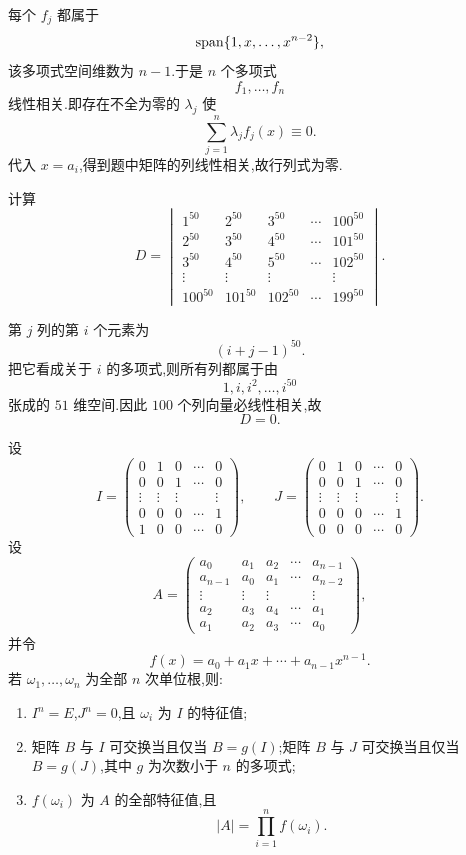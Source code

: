 \begin{solution}
每个 $f_j$ 都属于
\[
\operatorname{span}\{1,x,\ldots,x^{n-2}\},
\]
该多项式空间维数为 $n-1$.于是 $n$ 个多项式
\[
f_1,\ldots,f_n
\]
线性相关.即存在不全为零的 $\lambda_j$ 使
\[
\displaystyle\sum\limits_{j=1}^{n}\lambda_jf_j(x)\equiv0.
\]
代入 $x=a_i$,得到题中矩阵的列线性相关,故行列式为零.
\end{solution}


\begin{example}
计算
\[
D=
\begin{vmatrix}
1^{50}&2^{50}&3^{50}&\cdots&100^{50}\\
2^{50}&3^{50}&4^{50}&\cdots&101^{50}\\
3^{50}&4^{50}&5^{50}&\cdots&102^{50}\\
\vdots&\vdots&\vdots&&\vdots\\
100^{50}&101^{50}&102^{50}&\cdots&199^{50}
\end{vmatrix}.
\]
\end{example}
\exampleblank

\begin{solution}
第 $j$ 列的第 $i$ 个元素为
\[
(i+j-1)^{50}.
\]
把它看成关于 $i$ 的多项式,则所有列都属于由
\[
1,i,i^2,\ldots,i^{50}
\]
张成的 $51$ 维空间.因此 $100$ 个列向量必线性相关,故
\[
\boxed{D=0}.
\]
\end{solution}


\begin{proposition}
设
\[
I=
\begin{pmatrix}
0&1&0&\cdots&0\\
0&0&1&\cdots&0\\
\vdots&\vdots&\vdots&&\vdots\\
0&0&0&\cdots&1\\
1&0&0&\cdots&0
\end{pmatrix},
\qquad
J=
\begin{pmatrix}
0&1&0&\cdots&0\\
0&0&1&\cdots&0\\
\vdots&\vdots&\vdots&&\vdots\\
0&0&0&\cdots&1\\
0&0&0&\cdots&0
\end{pmatrix}.
\]
设
\[
A=
\begin{pmatrix}
a_0&a_1&a_2&\cdots&a_{n-1}\\
a_{n-1}&a_0&a_1&\cdots&a_{n-2}\\
\vdots&\vdots&\vdots&&\vdots\\
a_2&a_3&a_4&\cdots&a_1\\
a_1&a_2&a_3&\cdots&a_0
\end{pmatrix},
\]
并令
\[
f(x)=a_0+a_1x+\cdots+a_{n-1}x^{n-1}.
\]
若 $\omega_1,\ldots,\omega_n$ 为全部 $n$ 次单位根,则:
\begin{enumerate}
  \item $I^n=E$,$J^n=0$,且 $\omega_i$ 为 $I$ 的特征值;
  \item 矩阵 $B$ 与 $I$ 可交换当且仅当 $B=g(I)$;矩阵 $B$ 与 $J$ 可交换当且仅当 $B=g(J)$,其中 $g$ 为次数小于 $n$ 的多项式;
  \item $f(\omega_i)$ 为 $A$ 的全部特征值,且
  \[
  |A|=\prod\limits_{i=1}^{n}f(\omega_i).
  \]
\end{enumerate}
\end{proposition}

